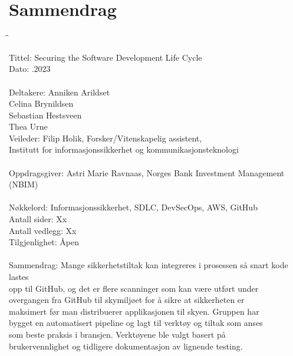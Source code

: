 \newpage
\chapter*{Sammendrag}

\begin{tabbing}
\hspace{2cm}\=\hspace{3cm}\=\kill %

Tittel: \> \> Securing the Software Development Life Cycle \\
Dato: \> .2023 \\ 
\\
Deltakere: \> \> Anniken Arildset \\ \> \> Celina Brynildsen \\ \> \> Sebastian Hestsveen \\ \> \> Thea Urne \\

Veileder: \> \> Filip Holik, Forsker/Vitenskapelig assistent, \\\> \> Institutt for informasjonssikkerhet og kommunikasjonsteknologi \\
\\
Oppdragsgiver: \> \>  Astri Marie Ravnaas, Norges Bank Investment Management (NBIM) \\
\\
Nøkkelord: \> \> Informasjonssikkerhet, SDLC, DevSecOps, AWS, GitHub \\

Antall sider: \> \> Xx \\
Antall vedlegg: \> \> Xx \\
Tilgjenlighet: \> \> Åpen \\
\\
Sammendrag: \> \>Mange sikkerhetstiltak kan integreres i prosessen så snart kode lastes \\\> \>opp til GitHub, og det er flere scanninger som kan være utført under \\\> \>overgangen fra GitHub til skymiljøet for å sikre at sikkerheten er \\\> \>maksimert før man distribuerer applikasjonen til skyen. Gruppen har \\\> \>bygget en automatisert pipeline og lagt til verktøy og tiltak som anses\\\> \> som beste praksis i bransjen. Verktøyene ble valgt basert på\\\> \> brukervennlighet og tidligere dokumentasjon av lignende testing.

\end{tabbing}


